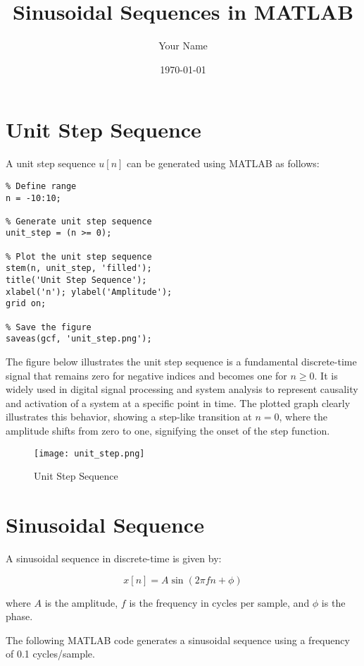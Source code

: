 \documentclass[a4paper,12pt]{article}
\begin{document}
\section{Unit Step Sequence}

A unit step sequence \( u[n] \) can be generated using MATLAB as follows:

\begin{verbatim}
% Define range
n = -10:10;  

% Generate unit step sequence
unit_step = (n >= 0);

% Plot the unit step sequence
stem(n, unit_step, 'filled');
title('Unit Step Sequence');
xlabel('n'); ylabel('Amplitude');
grid on;

% Save the figure
saveas(gcf, 'unit_step.png');
\end{verbatim}

The figure below illustrates the unit step sequence is a fundamental discrete-time signal that remains zero for negative indices and becomes one for \( n \geq 0 \). It is widely used in digital signal processing and system analysis to represent causality and activation of a system at a specific point in time. The plotted graph clearly illustrates this behavior, showing a step-like transition at \( n = 0 \), where the amplitude shifts from zero to one, signifying the onset of the step function.

\begin{figure}[H]
    \centering
    \texttt{[image: unit\_step.png]}
    \caption{Unit Step Sequence}
    \label{fig:unit_step}
\end{figure}
\title{Sinusoidal Sequences in MATLAB}
\author{Your Name}
\date{\today}
\maketitle

\section{Sinusoidal Sequence }
A sinusoidal sequence in discrete-time is given by:

\[
x[n] = A \sin(2\pi f n + \phi)
\]

where \( A \) is the amplitude, \( f \) is the frequency in cycles per sample, and \( \phi \) is the phase.


The following MATLAB code generates a sinusoidal sequence using a frequency of 0.1 cycles/sample.
\end{document}
